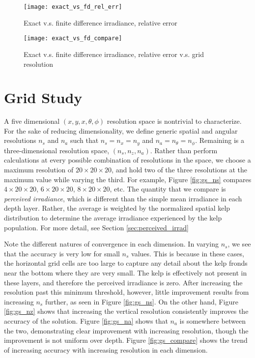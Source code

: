 \begin{figure}[H]
  \centering
  \texttt{[image: exact\_vs\_fd\_rel\_err]}
  \caption{Exact v.s. finite difference irradiance, relative error}
\end{figure}

\begin{figure}[H]
  \centering
  \texttt{[image: exact\_vs\_fd\_compare]}
  \caption{Exact v.s. finite difference irradiance, relative error v.s. grid resolution}
\end{figure}

\section{Grid Study}
A five dimensional $(x,y,x,\theta,\phi)$ resolution space is nontrivial to characterize.
For the sake of reducing dimensionality, we define generic spatial and angular resolutions
$n_s$ and $n_a$ such that $n_s=n_x=n_y$ and $n_a=n_\theta=n_\phi$.
Remaining is a three-dimensional resolution space, $(n_s,n_z,n_a)$.
Rather than perform calculations at every possible combination of resolutions in the space,
we choose a maximum resolution of $20 \times 20 \times 20$,
and hold two of the three resolutions at the maximum value while varying the third.
For example, Figure \ref{fig:gs_ns} compares $4 \times 20 \times 20$, $6 \times 20 \times 20$, $8 \times 20 \times 20$, etc.
The quantity that we compare is \textit{perceived irradiance}, which is different than the simple mean irradiance in each depth layer.
Rather, the average is weighted by the normalized spatial kelp distribution to determine the average irradiance experienced by the kelp population.
For more detail, see Section \ref{sec:perceived_irrad}

Note the different natures of convergence in each dimension.
In varying $n_s$, we see that the accuracy is very low for small $n_s$ values.
This is because in these cases, the horizontal grid cells are too large to capture any detail
about the kelp fronds near the bottom where they are very small.
The kelp is effectively not present in these layers, and therefore the perceived irradiance is zero.
After increasing the resolution past this minimum threshold, however, little improvement results
from increasing $n_s$ further, as seen in Figure \ref{fig:gs_ns}.
On the other hand, Figure \ref{fig:gs_nz} shows that increasing the vertical resolution
consistently improves the accuracy of the solution.
Figure \ref{fig:gs_na} shows that $n_a$ is somewhere between the two,
demonstrating clear improvement with increasing resolution, though the improvement is not uniform over depth.
Figure \ref{fig:gs_compare} shows the trend of increasing accuracy with increasing resolution in each dimension.

